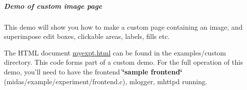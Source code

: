 \label{RC_mhttpd_Image_access_idx_ODB_tree_custom_images}
\hypertarget{RC_mhttpd_Image_access_idx_ODB_tree_custom_images}{}
 \subparagraph{Demo of custom image page}\label{RC_mhttpd_custom_demo}
\par




\par


This demo will show you how to make a custom page containing an image, and superimpose edit boxes, clickable areas, labels, fills etc.

The HTML document \hyperlink{myexpt_8html}{myexpt.html} can be found in the examples/custom directory. This code forms part of a custom demo. For the full operation of this demo, you'll need to have the frontend {\bfseries \char`\"{}sample frontend\char`\"{}} (midas/example/experiment/frontend.c), mlogger, mhttpd running.

